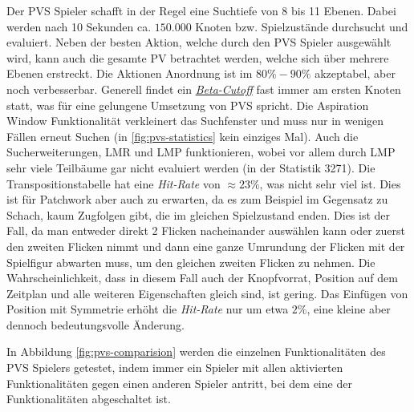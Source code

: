 Der \ac{PVS} Spieler schafft in der Regel eine Suchtiefe von 8 bis 11 Ebenen. Dabei werden nach 10 Sekunden ca. $150{.}000$ Knoten bzw. Spielzustände durchsucht und evaluiert. Neben der besten Aktion, welche durch den \ac{PVS} Spieler ausgewählt wird, kann auch die gesamte \acs{PV} betrachtet werden, welche sich über mehrere Ebenen erstreckt. Die Aktionen Anordnung ist im $80\%-90\%$ akzeptabel, aber noch verbesserbar. Generell findet ein \hyperref[text:beta-cutoff]{\emph{Beta-Cutoff}} fast immer am ersten Knoten statt, was für eine gelungene Umsetzung von \ac{PVS} spricht. Die Aspiration Window Funktionalität verkleinert das Suchfenster und muss nur in wenigen Fällen erneut Suchen (in \ref{fig:pvs-statistics} kein einziges Mal). Auch die Sucherweiterungen, \ac{LMR} und \ac{LMP} funktionieren, wobei vor allem durch \ac{LMP} sehr viele Teilbäume gar nicht evaluiert werden (in der Statistik 3271). Die Transpositionstabelle hat eine \emph{Hit-Rate} von $\approx 23\%$, was nicht sehr viel ist. Dies ist für Patchwork aber auch zu erwarten, da es zum Beispiel im Gegensatz zu Schach, kaum Zugfolgen gibt, die im gleichen Spielzustand enden. Dies ist der Fall, da man entweder direkt 2 Flicken nacheinander auswählen kann oder zuerst den zweiten Flicken nimmt und dann eine ganze Umrundung der Flicken mit der Spielfigur abwarten muss, um den gleichen zweiten Flicken zu nehmen. Die Wahrscheinlichkeit, dass in diesem Fall auch der Knopfvorrat, Position auf dem Zeitplan und alle weiteren Eigenschaften gleich sind, ist gering. Das Einfügen von Position mit Symmetrie erhöht die \emph{Hit-Rate} nur um etwa $2\%$, eine kleine aber dennoch bedeutungsvolle Änderung.

In Abbildung \ref{fig:pvs-comparision} werden die einzelnen Funktionalitäten des \ac{PVS} Spielers getestet, indem immer ein Spieler mit allen aktivierten Funktionalitäten gegen einen anderen Spieler antritt, bei dem eine der Funktionalitäten abgeschaltet ist.


